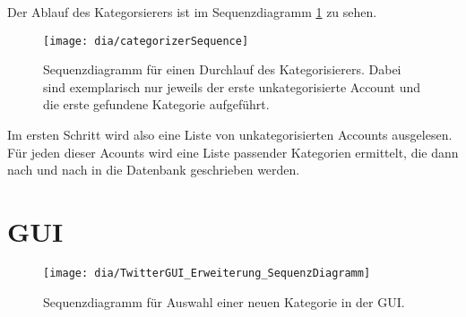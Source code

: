 Der Ablauf des Kategorsierers ist im Sequenzdiagramm \ref{fig:categorizerSeq} zu sehen.
\begin{figure}[h!]
	\centering
	\texttt{[image: dia/categorizerSequence]}
	\caption{Sequenzdiagramm für einen Durchlauf des Kategorisierers. Dabei sind exemplarisch nur jeweils der erste unkategorisierte Account und die erste gefundene Kategorie aufgeführt.}
	\label{fig:categorizerSeq}
\end{figure}

Im ersten Schritt wird also eine Liste von unkategorisierten Accounts ausgelesen. Für jeden dieser Acounts wird eine Liste passender Kategorien ermittelt, die dann nach und nach in die Datenbank geschrieben werden.
\section{GUI}
\begin{figure}[h!]
	\centering
	\texttt{[image: dia/TwitterGUI\_Erweiterung\_SequenzDiagramm]}
	\caption{Sequenzdiagramm für Auswahl einer neuen Kategorie in der GUI.}
	\label{fig:GUISeq}
\end{figure}
